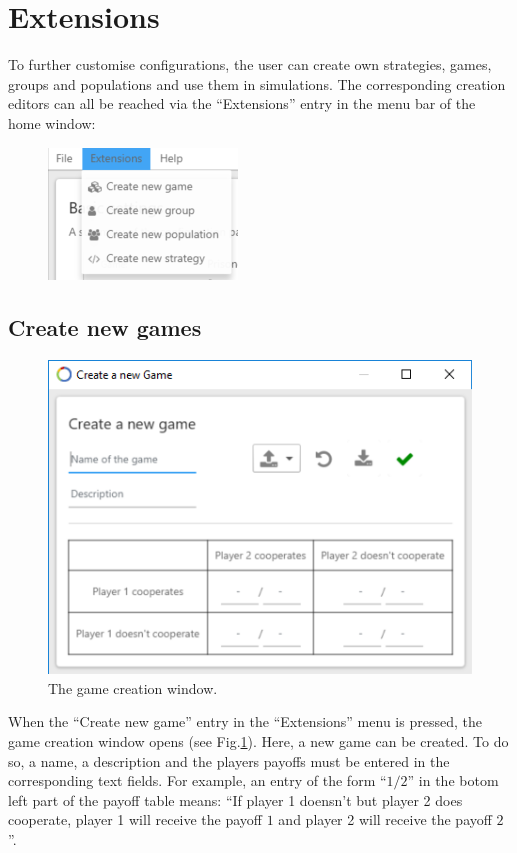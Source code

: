 \documentclass[parskip=full,11pt]{scrartcl}
\begin{document}
\section{Extensions}

To further customise configurations, the user can create own strategies, games, groups and populations and use them in simulations. The corresponding creation editors can all be reached via the \enquote{Extensions} entry in the menu bar of the home window:
\begin{figure}[h]
	\centering
	\includegraphics[width=0.4\linewidth]{img_manual/menubar_extensions.png}
\end{figure}

\subsection{Create new games}
\begin{figure}
	\centering
	\includegraphics[width=0.8\linewidth]{img_manual/game_window.png}
	\caption{The game creation window.}
	\label{fig:game_window}
\end{figure}
When the \enquote{Create new game} entry in the \enquote{Extensions} menu is pressed, the game creation window opens (see Fig.\ref{fig:game_window}). Here, a new game can be created. To do so, a name, a description and the players payoffs must be entered in the corresponding text fields. For example, an entry of the form \enquote{\(1 / 2\)} in the botom left part of the payoff table means: \enquote{If player 1 doensn't but player 2 does cooperate, player 1 will receive the payoff \(1\) and player 2 will receive the payoff \(2\)}.
\end{document}
